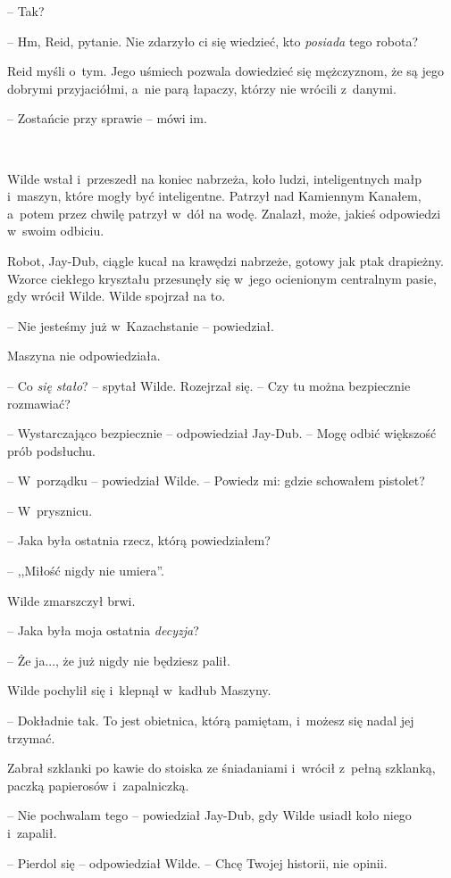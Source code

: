 \documentclass[oneside,polish,11pt,sfheadings]{mwbk}
\begin{document}
-- Tak?

-- Hm, Reid, pytanie. Nie zdarzyło ci się wiedzieć, kto \emph{posiada}
tego robota?

Reid myśli o~tym. Jego uśmiech pozwala dowiedzieć się mężczyznom, że są
jego dobrymi przyjaciółmi, a~nie parą łapaczy, którzy nie wrócili z~danymi.

-- Zostańcie przy sprawie -- mówi im.

~

Wilde wstał i~przeszedł na koniec nabrzeża, koło ludzi, inteligentnych
małp i~maszyn, które mogły być inteligentne. Patrzył nad Kamiennym
Kanałem, a~potem przez chwilę patrzył w~dół na wodę. Znalazł, może,
jakieś odpowiedzi w~swoim odbiciu.

Robot, Jay-Dub, ciągle kucał na krawędzi nabrzeże, gotowy jak ptak
drapieżny. Wzorce ciekłego kryształu przesunęły się w~jego ocienionym
centralnym pasie, gdy wrócił Wilde. Wilde spojrzał na to.

-- Nie jesteśmy już w~Kazachstanie -- powiedział.

Maszyna nie odpowiedziała.

-- Co \emph{się stało}? -- spytał Wilde. Rozejrzał się. -- Czy tu można
bezpiecznie rozmawiać?

-- Wystarczająco bezpiecznie -- odpowiedział Jay-Dub. -- Mogę odbić
większość prób podsłuchu.

-- W~porządku -- powiedział Wilde. -- Powiedz mi: gdzie schowałem pistolet?

-- W~prysznicu.

-- Jaka była ostatnia rzecz, którą powiedziałem?

-- ,,Miłość nigdy nie umiera''.

Wilde zmarszczył brwi.

-- Jaka była moja ostatnia \emph{decyzja}?

-- Że ja..., że już nigdy nie będziesz palił.

Wilde pochylił się i~klepnął w~kadłub Maszyny.

-- Dokładnie tak. To jest obietnica, którą pamiętam, i~możesz się nadal
jej trzymać.

Zabrał szklanki po kawie do stoiska ze śniadaniami i~wrócił z~pełną
szklanką, paczką papierosów i~zapalniczką.

-- Nie pochwalam tego -- powiedział Jay-Dub, gdy Wilde usiadł koło niego i~zapalił.

-- Pierdol się -- odpowiedział Wilde. -- Chcę Twojej historii, nie opinii.
\end{document}
